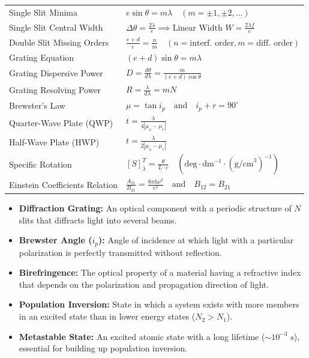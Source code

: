 \documentclass[12pt,a4paper]{article}
\renewcommand{\arraystretch}{1.45}
\begin{document}
\begin{tcolorbox}[formulabox, title={\textbf{Key Formulas and Metrics at a Glance}}]
\renewcommand{\arraystretch}{1.35}
\begin{tabularx}{\linewidth}{B{5.0cm} X}
Single Slit Minima & $e \sin\theta = m \lambda \quad (m = \pm 1, \pm 2, \ldots)$ \\[4pt]
Single Slit Central Width & $\Delta \theta = \frac{2\lambda}{e} \implies \text{Linear Width } W = \frac{2\lambda f}{e}$ \\[4pt]
Double Slit Missing Orders & $\frac{e+d}{e} = \frac{n}{m} \quad (n = \text{interf. order}, m = \text{diff. order})$ \\[4pt]
Grating Equation & $(e+d)\sin\theta = m \lambda$ \\[4pt]
Grating Dispersive Power & $D = \frac{d\theta}{d\lambda} = \frac{m}{(e+d)\cos\theta}$ \\[4pt]
Grating Resolving Power & $R = \frac{\lambda}{d\lambda} = m N$ \\[4pt]
Brewster's Law & $\mu = \tan i_p \quad \text{and} \quad i_p + r = 90^\circ$ \\[4pt]
Quarter-Wave Plate (QWP) & $t = \frac{\lambda}{4 |\mu_o - \mu_e|}$ \\[4pt]
Half-Wave Plate (HWP) & $t = \frac{\lambda}{2 |\mu_o - \mu_e|}$ \\[4pt]
Specific Rotation & $[S]_\lambda^T = \frac{\theta}{L \cdot c} \quad (\text{deg} \cdot \text{dm}^{-1} \cdot (\text{g/cm}^3)^{-1})$ \\[4pt]
Einstein Coefficients Relation & $\frac{A_{21}}{B_{21}} = \frac{8\pi h \nu^3}{c^3} \quad \text{and} \quad B_{12} = B_{21}$ \\[4pt]
\end{tabularx}
\end{tcolorbox}

\begin{tcolorbox}[defbox, title={\textbf{One-Line Definitions}}]
\begin{itemize}[leftmargin=*, itemsep=2pt]
  \item \textbf{Diffraction Grating:} An optical component with a periodic structure of $N$ slits that diffracts light into several beams.
  \item \textbf{Brewster Angle ($i_p$):} Angle of incidence at which light with a particular polarization is perfectly transmitted without reflection.
  \item \textbf{Birefringence:} The optical property of a material having a refractive index that depends on the polarization and propagation direction of light.
  \item \textbf{Population Inversion:} State in which a system exists with more members in an excited state than in lower energy states ($N_2 > N_1$).
  \item \textbf{Metastable State:} An excited atomic state with a long lifetime ($\sim 10^{-3}\text{ s}$), essential for building up population inversion.
\end{itemize}
\end{tcolorbox}
\end{document}
